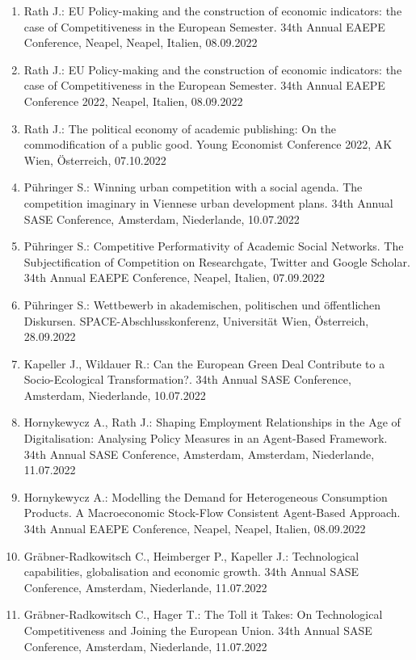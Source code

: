 \begin{enumerate}
	\item Rath J.: EU Policy-making and the construction of economic indicators: the case of Competitiveness in the European Semester. 34th Annual EAEPE Conference, Neapel, Neapel, Italien, 08.09.2022
	\item Rath J.: EU Policy-making and the construction of economic indicators: the case of Competitiveness in the European Semester. 34th Annual EAEPE Conference 2022, Neapel, Italien, 08.09.2022
	\item Rath J.: The political economy of academic publishing: On the commodification of a public good. Young Economist Conference 2022, AK Wien, Österreich, 07.10.2022
	\item Pühringer S.: Winning urban competition with a social agenda. The competition imaginary in Viennese urban development plans. 34th Annual SASE Conference, Amsterdam, Niederlande, 10.07.2022
	\item Pühringer S.: Competitive Performativity of Academic Social Networks. The Subjectification of Competition on Researchgate, Twitter and Google Scholar. 34th Annual EAEPE Conference, Neapel, Italien, 07.09.2022
	\item Pühringer S.: Wettbewerb in akademischen, politischen und öffentlichen Diskursen. SPACE-Abschlusskonferenz,  Universität Wien, Österreich, 28.09.2022
	\item Kapeller J., Wildauer R.: Can the European Green Deal Contribute to a Socio-Ecological Transformation?. 34th Annual SASE Conference, Amsterdam, Niederlande, 10.07.2022
	\item Hornykewycz A., Rath J.: Shaping Employment Relationships in the Age of Digitalisation: Analysing Policy Measures in an Agent-Based Framework. 34th Annual SASE Conference, Amsterdam, Amsterdam, Niederlande, 11.07.2022
	\item Hornykewycz A.: Modelling the Demand for Heterogeneous Consumption Products. A Macroeconomic Stock-Flow Consistent Agent-Based Approach. 34th Annual EAEPE Conference, Neapel, Neapel, Italien, 08.09.2022
	\item Gräbner-Radkowitsch C., Heimberger P., Kapeller J.: Technological capabilities, globalisation and economic growth. 34th Annual SASE Conference, Amsterdam, Niederlande, 11.07.2022
	\item Gräbner-Radkowitsch C., Hager T.: The Toll it Takes: On Technological Competitiveness and Joining the European Union. 34th Annual SASE Conference, Amsterdam, Niederlande, 11.07.2022

\end{enumerate}
